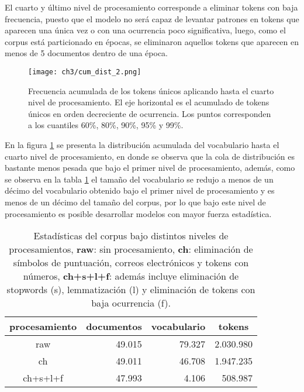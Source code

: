 \documentclass[letterpaper,12pt,oneside]{book} %
\begin{document}
El cuarto y último nivel de procesamiento corresponde a eliminar tokens con baja frecuencia, puesto que el modelo no será capaz de levantar patrones en tokens que aparecen una única vez o con una ocurrencia poco significativa, luego, como el corpus está particionado en épocas, se eliminaron aquellos tokens que aparecen en menos de 5 documentos dentro de una época.

\begin{figure}
    \centering
    \texttt{[image: ch3/cum\_dist\_2.png]}
    \caption{Frecuencia acumulada de los tokens únicos aplicando hasta el cuarto nivel de procesamiento. El eje horizontal es el acumulado de tokens únicos en orden decreciente de ocurrencia. Los puntos corresponden a los cuantiles 60\%, 80\%, 90\%, 95\% y 99\%.}
    \label{img:cum_dist2}
\end{figure}

En la figura \ref{img:cum_dist2} se presenta la distribución acumulada del vocabulario hasta el cuarto nivel de procesamiento, en donde se observa que la cola de distribución es bastante menos pesada que bajo el primer nivel de procesamiento, además, como se observa en la tabla \ref{table:processing_stats} el tamaño del vocabulario se redujo a menos de un décimo del vocabulario obtenido bajo el primer nivel de procesamiento y es menos de un décimo del tamaño del corpus, por lo que bajo este nivel de procesamiento es posible desarrollar modelos con mayor fuerza estadística.

\begin{table}[H]
    \begin{tabular}{|c|r|r|r|}
        \hline
        procesamiento & \multicolumn{1}{c|}{documentos} & \multicolumn{1}{c|}{vocabulario} & \multicolumn{1}{c|}{tokens} \\ \hline
        raw          & 49.015                           & 79.327                            & 2.030.980                     \\ \hline
        ch    & 49.011                           & 46.708                            & 1.947.235                     \\ \hline
        ch+s+l+f      & 47.993                           & 4.106                             & 508.987                      \\ \hline
        \end{tabular}
    \caption{Estadísticas del corpus bajo distintos niveles de procesamientos, \textbf{raw}: sin procesamiento, \textbf{ch}: eliminación de símbolos de puntuación, correos electrónicos y tokens con números, \textbf{ch+s+l+f}: además incluye eliminación de stopwords (s), lemmatización (l) y eliminación de tokens con baja ocurrencia (f).}
    \label{table:processing_stats}
\end{table}
\end{document}
